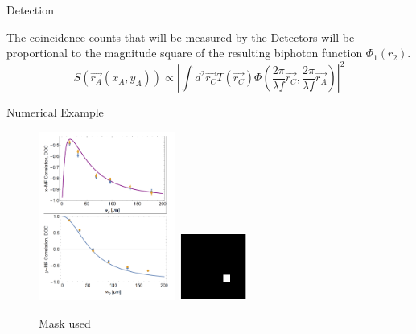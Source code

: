 \documentclass[xcolor=dvipsnames]{beamer}
\begin{document}
\begin{frame}{Detection}

\item The coincidence counts that will be measured by the Detectors will be proportional to the magnitude square of the resulting biphoton function $\Phi_1 (r_2)$.
\begin{equation}
S(\vec{r_A}(x_A,y_A)) \propto |  \int d^2 \vec{r_C} T(\vec{r_C}) \Phi (\frac{2 \pi}{\lambda f}\vec{r_C}, \frac{2 \pi}{\lambda f}\vec{r_A}) |^2
\end{equation}
\end{frame}
\begin{frame}{Numerical Example}
\begin{figure}

{  \includegraphics[width=0.4\textwidth]{pictures/correlationGraph.png} }
{  \includegraphics[width=0.2\textwidth]{pictures/mask.png} }
\caption{Mask used}
 \label{n1}
 
\end{figure}

\end{frame}
\end{document}
